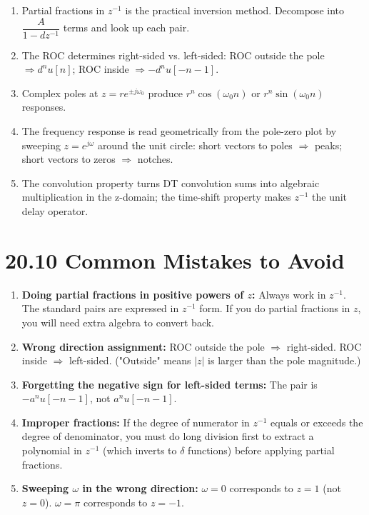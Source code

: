 \documentclass[11pt]{article}
\begin{document}
\begin{enumerate}
  \item Partial fractions in $z^{-1}$ is the practical inversion method. Decompose into $\dfrac{A}{1 - d z^{-1}}$ terms and look up each pair.
  \item The ROC determines right-sided vs. left-sided: ROC outside the pole $\Rightarrow d^n u[n]$; ROC inside $\Rightarrow -d^n u[-n-1]$.
  \item Complex poles at $z = r e^{\pm j \omega_0}$ produce $r^n \cos(\omega_0 n)$ or $r^n \sin(\omega_0 n)$ responses.
  \item The frequency response is read geometrically from the pole-zero plot by sweeping $z = e^{j\omega}$ around the unit circle: short vectors to poles $\Rightarrow$ peaks; short vectors to zeros $\Rightarrow$ notches.
  \item The convolution property turns DT convolution sums into algebraic multiplication in the z-domain; the time-shift property makes $z^{-1}$ the unit delay operator.
\end{enumerate}

\section*{20.10 Common Mistakes to Avoid}

\begin{enumerate}
  \item \textbf{Doing partial fractions in positive powers of $z$:} Always work in $z^{-1}$. The standard pairs are expressed in $z^{-1}$ form. If you do partial fractions in $z$, you will need extra algebra to convert back.
  \item \textbf{Wrong direction assignment:} ROC outside the pole $\Rightarrow$ right-sided. ROC inside $\Rightarrow$ left-sided. ("Outside" means $|z|$ is larger than the pole magnitude.)
  \item \textbf{Forgetting the negative sign for left-sided terms:} The pair is $-a^n u[-n-1]$, not $a^n u[-n-1]$.
  \item \textbf{Improper fractions:} If the degree of numerator in $z^{-1}$ equals or exceeds the degree of denominator, you must do long division first to extract a polynomial in $z^{-1}$ (which inverts to $\delta$ functions) before applying partial fractions.
  \item \textbf{Sweeping $\omega$ in the wrong direction:} $\omega = 0$ corresponds to $z = 1$ (not $z = 0$). $\omega = \pi$ corresponds to $z = -1$.
\end{enumerate}
\end{document}
